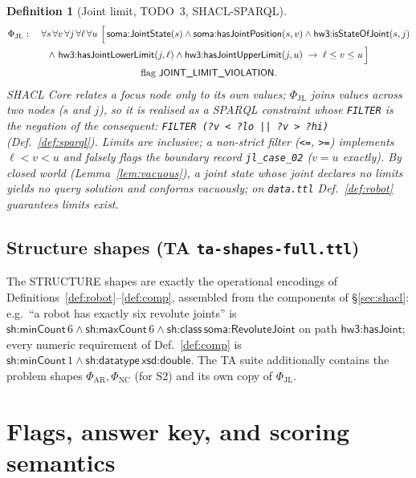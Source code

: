 \documentclass[11pt,a4paper]{article}
\newtheorem{definition}{Definition}[section]
\newcommand{\IRI}[1]{\textsf{#1}}                    %
\newcommand{\dbl}{\IRI{xsd{:}double}}
\begin{document}
\begin{definition}[Joint limit, TODO~3, SHACL-SPARQL]\label{def:jl}
\begin{gather*}
  \Phi_{\mathrm{JL}}:\quad
  \forall s\,\forall v\,\forall j\,\forall \ell\,\forall u\
  \Bigl[\, \IRI{soma{:}JointState}(s) \wedge \IRI{soma{:}hasJointPosition}(s,v)
  \wedge \IRI{hw3{:}isStateOfJoint}(s,j) \\
  \wedge\ \IRI{hw3{:}hasJointLowerLimit}(j,\ell) \wedge
  \IRI{hw3{:}hasJointUpperLimit}(j,u)
  \;\rightarrow\; \ell \le v \le u \,\Bigr] \\
  \text{flag \textsf{JOINT\_LIMIT\_VIOLATION}}.
\end{gather*}
SHACL Core relates a focus node only to its own values; $\Phi_{\mathrm{JL}}$
joins values across two nodes ($s$ and $j$), so it is realised as a SPARQL
constraint whose \texttt{FILTER} is the negation of the consequent:
\texttt{FILTER (?v < ?lo || ?v > ?hi)} (Def.~\ref{def:sparql}). Limits are
inclusive; a non-strict filter (\texttt{<=}, \texttt{>=}) implements
$\ell < v < u$ and falsely flags the boundary record \texttt{jl\_case\_02}
($v = u$ exactly). By closed world (Lemma~\ref{lem:vacuous}), a joint state whose
joint declares no limits yields no query solution and conforms vacuously; on
\texttt{data.ttl} Def.~\ref{def:robot} guarantees limits exist.
\end{definition}

\subsection{Structure shapes (TA \texttt{ta-shapes-full.ttl})}\label{sec:structure}

The \textsf{STRUCTURE} shapes are exactly the operational encodings of
Definitions~\ref{def:robot}--\ref{def:comp}, assembled from the components of
\S\ref{sec:shacl}: e.g.\ ``a robot has exactly six revolute joints'' is
$\IRI{sh{:}minCount}\,6 \wedge \IRI{sh{:}maxCount}\,6 \wedge \IRI{sh{:}class}\,
\IRI{soma{:}RevoluteJoint}$ on path $\IRI{hw3{:}hasJoint}$; every numeric
requirement of Def.~\ref{def:comp} is $\IRI{sh{:}minCount}\,1 \wedge
\IRI{sh{:}datatype}\,\dbl$. The TA suite additionally contains the problem
shapes $\Phi_{\mathrm{AR}}, \Phi_{\mathrm{NC}}$ (for S2) and its own copy of
$\Phi_{\mathrm{JL}}$.

\section{Flags, answer key, and scoring semantics}\label{sec:scoring}
\end{document}
